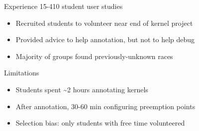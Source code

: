 \documentclass[xcolor=dvipsnames]{beamer}
\begin{document}


\begin{frame}{Experience}
	15-410 student user studies
	\begin{itemize}
		\item Recruited students to volunteer near end of kernel project
		\item Provided advice to help annotation, but not to help debug
		\item Majority of groups found previously-unknown races
	\end{itemize}
	\pause
	\linegap

	Limitations
	\begin{itemize}
		\item Students spent \textasciitilde{}2 hours annotating kernels
		\item After annotation, 30-60 min configuring preemption points
		\item Selection bias: only students with free time volunteered
	\end{itemize}
\end{frame}





\end{document}
